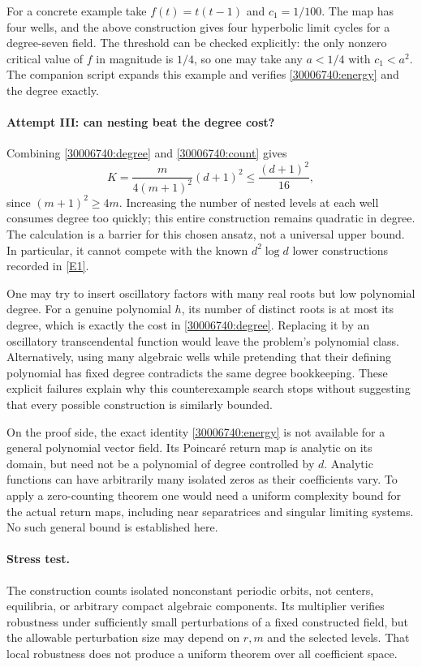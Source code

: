 \documentclass[11pt,a4paper]{article}
\newcommand{\eref}[2]{\hyperlink{extra:#1:#2}{[E#2]}}
\numberwithin{equation}{section}
\begin{document}
For a concrete example take $f(t)=t(t-1)$ and $c_1=1/100$.
The map has four wells, and the above construction gives four hyperbolic
limit cycles for a degree-seven field.  The threshold can be checked
explicitly: the only nonzero critical value of $f$ in magnitude is
$1/4$, so one may take any $a<1/4$ with $c_1<a^2$.
The companion script expands this example and verifies
\eqref{30006740:energy} and the degree exactly.

\paragraph{Attempt III: can nesting beat the degree cost?}
Combining \eqref{30006740:degree} and \eqref{30006740:count} gives
\[
 K=\frac{m}{4(m+1)^2}(d+1)^2
       \leq\frac{(d+1)^2}{16},
\]
since $(m+1)^2\geq4m$.  Increasing the number of nested levels at each
well consumes degree too quickly; this entire construction remains
quadratic in degree.  The calculation is a barrier for this chosen
ansatz, not a universal upper bound.  In particular, it cannot compete
with the known $d^2\log d$ lower constructions recorded in
\eref{30006740}{1}.

One may try to insert oscillatory factors with many real roots but low
polynomial degree.  For a genuine polynomial $h$, its number of distinct
roots is at most its degree, which is exactly the cost in
\eqref{30006740:degree}.  Replacing it by an oscillatory transcendental
function would leave the problem's polynomial class.  Alternatively,
using many algebraic wells while pretending that their defining
polynomial has fixed degree contradicts the same degree bookkeeping.
These explicit failures explain why this counterexample search stops
without suggesting that every possible construction is similarly bounded.

On the proof side, the exact identity \eqref{30006740:energy} is not available
for a general polynomial vector field.  Its Poincar\'e return map is
analytic on its domain, but need not be a polynomial of degree controlled
by $d$.  Analytic functions can have arbitrarily many isolated zeros as
their coefficients vary.  To apply a zero-counting theorem one would
need a uniform complexity bound for the actual return maps, including
near separatrices and singular limiting systems.  No such general bound
is established here.

\paragraph{Stress test.}
The construction counts isolated nonconstant periodic orbits, not
centers, equilibria, or arbitrary compact algebraic components.  Its
multiplier verifies robustness under sufficiently small perturbations
of a fixed constructed field, but the allowable perturbation size may
depend on $r,m$ and the selected levels.  That local robustness does not
produce a uniform theorem over all coefficient space.
\end{document}
